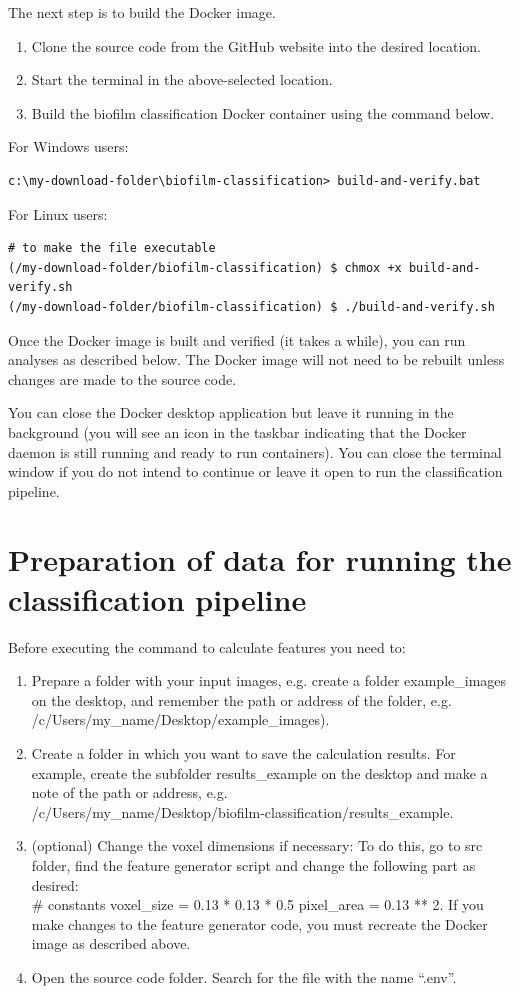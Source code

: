 \documentclass{ol-softwaremanual}
\begin{document}
The next step is to build the Docker image.
\begin{enumerate}
	\item Clone the source code from the GitHub website into the desired location.
	\item Start the terminal in the above-selected location.
	\item Build the biofilm classification Docker container using the command below.
\end{enumerate}

For Windows users:
\begin{verbatim}
c:\my-download-folder\biofilm-classification> build-and-verify.bat
\end{verbatim}

For Linux users:
\begin{verbatim}
# to make the file executable
(/my-download-folder/biofilm-classification) $ chmox +x build-and-verify.sh 
(/my-download-folder/biofilm-classification) $ ./build-and-verify.sh
\end{verbatim}

Once the Docker image is built and verified (it takes a while), you can run analyses as described below. 
The Docker image will not need to be rebuilt unless changes are made to the source code.

You can close the Docker desktop application but leave it running in the background (you will see an icon in the taskbar indicating that the Docker daemon is still running and ready to run containers). You can close the terminal window if you do not intend to continue or leave it open to run the classification pipeline.


\section{Preparation of data for running the classification pipeline}

Before executing the command to calculate features you need to: 
\begin{enumerate}
	\item Prepare a folder with your input images, e.g. create a folder example\_images on the desktop, and remember the path or address of the folder, e.g. /c/Users/my\_name/Desktop/example\_images).
	\item Create a folder in which you want to save the calculation results. For example, create the subfolder results\_example on the desktop and make a note of the path or address, e.g.\\ /c/Users/my\_name/Desktop/biofilm-classification/results\_example.
	\item (optional) Change the voxel dimensions if necessary: To do this, go to src folder, find the feature generator script and change the following part as desired: \\
	\# constants voxel\_size = 0.13 * 0.13 * 0.5 pixel\_area = 0.13 ** 2. If you make changes to the feature generator code, you must recreate the Docker image as described above.
	\item Open the source code folder. Search for the file with the name “.env”.
\end{enumerate}
\end{document}
